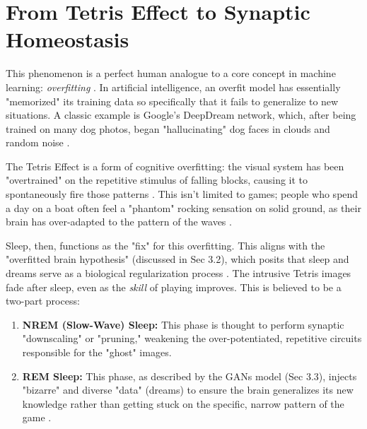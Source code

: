 \section{From Tetris Effect to Synaptic Homeostasis}\label{sec:tetris_synaptic_homeostasis}

This phenomenon is a perfect human analogue to a core concept in machine learning: \textit{overfitting} \citep{hoel2021overfitted}. In artificial intelligence, an overfit model has essentially "memorized" its training data so specifically that it fails to generalize to new situations. A classic example is Google's DeepDream network, which, after being trained on many dog photos, began "hallucinating" dog faces in clouds and random noise \citep{fastco2015deepdream}.

The Tetris Effect is a form of cognitive overfitting: the visual system has been "overtrained" on the repetitive stimulus of falling blocks, causing it to spontaneously fire those patterns \citep{tufts2021overfitted}. This isn't limited to games; people who spend a day on a boat often feel a "phantom" rocking sensation on solid ground, as their brain has over-adapted to the pattern of the waves \citep{tufts2021overfitted}.

Sleep, then, functions as the "fix" for this overfitting. This aligns with the "overfitted brain hypothesis" (discussed in Sec 3.2), which posits that sleep and dreams serve as a biological regularization process \citep{hoel2021overfitted}. The intrusive Tetris images fade after sleep, even as the \textit{skill} of playing improves. This is believed to be a two-part process:
\begin{enumerate}
    \item \textbf{NREM (Slow-Wave) Sleep:} This phase is thought to perform synaptic "downscaling" or "pruning," weakening the over-potentiated, repetitive circuits responsible for the "ghost" images.
    \item \textbf{REM Sleep:} This phase, as described by the GANs model (Sec 3.3), injects "bizarre" and diverse "data" (dreams) to ensure the brain generalizes its new knowledge rather than getting stuck on the specific, narrow pattern of the game \citep{franceschi2024gans}.
\end{enumerate}
